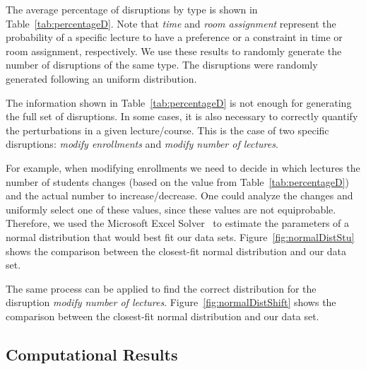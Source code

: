 \documentclass[runningheads]{llncs}
\begin{document}
The average percentage of disruptions by type is shown in Table~\ref{tab:percentageD}. Note that \textit{time} and \textit{room assignment} represent the probability of a specific lecture to have a preference or a constraint in time or room assignment, respectively. We use these results to randomly generate the number of disruptions of the same type. The disruptions were randomly generated following an uniform distribution. %


 The information shown in Table~\ref{tab:percentageD} is not enough for generating the full set of disruptions. In some cases, it is also necessary to correctly quantify the perturbations in a given lecture/course. This is the case of two specific disruptions: \textit{modify enrollments} and \textit{modify number of lectures}.
 
 For example, when modifying enrollments we need to decide in which lectures the number of students changes (based on the value from Table~\ref{tab:percentageD}) and the actual number to increase/decrease. One could analyze the changes and uniformly select one of these values, since these values are not equiprobable. Therefore, we used the Microsoft Excel Solver~\cite{DBLP:journals/interfaces/FylstraLWW98} to estimate the parameters of a normal distribution that would best fit our data sets. Figure~\ref{fig:normalDistStu} shows the comparison between the closest-fit normal distribution and our data set.
 
 The same process can be applied to find the correct distribution for the disruption \textit{modify number of lectures}. Figure~\ref{fig:normalDistShift} shows the comparison between the closest-fit normal distribution and our data set.
 
 
\subsection{Computational Results}
\end{document}
